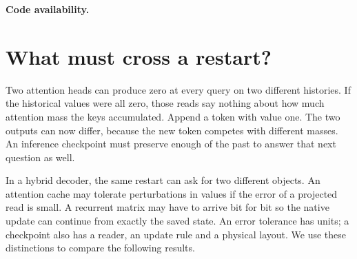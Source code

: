 
\begin{abstract}
How many bits of a prefix must an inference engine carry across a restart to preserve its future answers? For softmax attention on the unit sphere we determine the leading bit cost of a single checkpoint, with known prefix length, fixed dimension and temperature, and uniform error over all continuations. The normalization mass costs as much, to leading order, as one additional value coordinate. A pair of suffixes recovers that mass. Spherical harmonic decay determines how finely each observable coefficient must be stored. We relate this result to the minimum continuous streaming dimension and examine two storage contracts in Qwen3.5-0.8B. An exact-key, bounded-value cache saves 21.1--21.7\% of reserved KV storage; pooled decoding throughput changes by $-0.22$ to $+0.61$\% across three context lengths. For bitwise restart of recurrent matrices, an exact reference selector saves 106,994 bytes across 42.5 million FP32 words. A format lower bound explains the remaining gap to bit shuffling and Zstandard. A one-byte selector between the two formats saves a further 1,357,991 bytes over the smaller fixed format. The three results locate the cost in the information that future reads expose, the numerical error a codec permits, and the bytes its layout actually spends.
\end{abstract}

\noindent\textbf{Code availability.} \codesentence

\section{What must cross a restart?}
Two attention heads can produce zero at every query on two different histories. If the historical values were all zero, those reads say nothing about how much attention mass the keys accumulated. Append a token with value one. The two outputs can now differ, because the new token competes with different masses. An inference checkpoint must preserve enough of the past to answer that next question as well.

In a hybrid decoder, the same restart can ask for two different objects. An attention cache may tolerate perturbations in values if the error of a projected read is small. A recurrent matrix may have to arrive bit for bit so the native update can continue from exactly the saved state. An error tolerance has units; a checkpoint also has a reader, an update rule and a physical layout. We use these distinctions to compare the following results.

